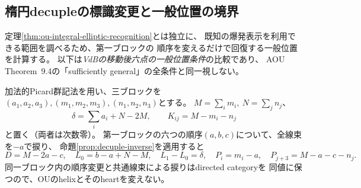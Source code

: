 \subsection{楕円decupleの標識変更と一般位置の境界}
\label{subsec:ou-elliptic-markings}

定理\ref{thm:ou-integral-elliptic-recognition}とは独立に、
既知の爆発表示を利用できる範囲を調べるため、第一ブロックの
順序を変えるだけで回復する一般位置を計算する。
以下は\emph{VdBの移動後六点の一般位置条件}の比較であり、
AOU Theorem~9.4の「sufficiently general」の全条件と同一視しない。

加法的Picard群記法を用い、三ブロックを
$(a_1,a_2,a_3),(m_1,m_2,m_3),(n_1,n_2,n_3)$とする。
$M=\sum_i m_i,\ N=\sum_j n_j$、
\[
 \delta=\sum_i a_i+N-2M,\qquad K_{ij}=M-m_i-n_j
\]
と置く（両者は次数零）。
第一ブロックの六つの順序$(a,b,c)$について、全線束を$-a$で捩り、
命題\ref{prop:decuple-inverse}を適用すると
\[
 D=M-2a-c,\quad L_0=b-a+N-M,\quad L_1-L_0=\delta,
 \quad P_i=m_i-a,\quad P_{j+3}=M-a-c-n_j .
\]
同一ブロック内の順序変更と共通線束による捩りはdirected categoryを
同値に保つので、OUのhelixとそのheartを変えない。

